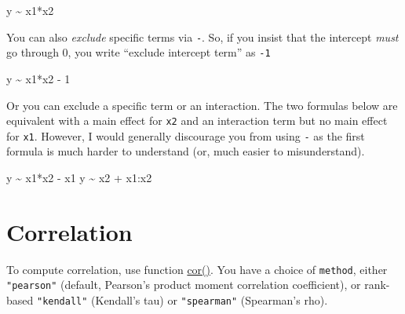 \documentclass[
]{book}
\newenvironment{Shaded}{\begin{snugshade}}{\end{snugshade}}
\newcommand{\AttributeTok}[1]{\textcolor[rgb]{0.77,0.63,0.00}{#1}}
\newcommand{\DecValTok}[1]{\textcolor[rgb]{0.00,0.00,0.81}{#1}}
\newcommand{\FloatTok}[1]{\textcolor[rgb]{0.00,0.00,0.81}{#1}}
\newcommand{\FunctionTok}[1]{\textcolor[rgb]{0.00,0.00,0.00}{#1}}
\newcommand{\NormalTok}[1]{#1}
\newcommand{\OtherTok}[1]{\textcolor[rgb]{0.56,0.35,0.01}{#1}}
\newcommand{\SpecialCharTok}[1]{\textcolor[rgb]{0.00,0.00,0.00}{#1}}
\newcommand{\StringTok}[1]{\textcolor[rgb]{0.31,0.60,0.02}{#1}}
\begin{document}
\begin{Shaded}
\begin{Highlighting}[]
\NormalTok{y }\SpecialCharTok{\textasciitilde{}}\NormalTok{ x1}\SpecialCharTok{*}\NormalTok{x2}
\end{Highlighting}
\end{Shaded}

You can also \emph{exclude} specific terms via \texttt{-}. So, if you insist that the intercept \emph{must} go through 0, you write ``exclude intercept term'' as \texttt{-1}

\begin{Shaded}
\begin{Highlighting}[]
\NormalTok{y }\SpecialCharTok{\textasciitilde{}}\NormalTok{ x1}\SpecialCharTok{*}\NormalTok{x2 }\SpecialCharTok{{-}} \DecValTok{1}
\end{Highlighting}
\end{Shaded}

Or you can exclude a specific term or an interaction. The two formulas below are equivalent with a main effect for \texttt{x2} and an interaction term but no main effect for \texttt{x1}. However, I would generally discourage you from using \texttt{-} as the first formula is much harder to understand (or, much easier to misunderstand).

\begin{Shaded}
\begin{Highlighting}[]
\NormalTok{y }\SpecialCharTok{\textasciitilde{}}\NormalTok{ x1}\SpecialCharTok{*}\NormalTok{x2 }\SpecialCharTok{{-}}\NormalTok{ x1}
\NormalTok{y }\SpecialCharTok{\textasciitilde{}}\NormalTok{ x2 }\SpecialCharTok{+}\NormalTok{ x1}\SpecialCharTok{:}\NormalTok{x2}
\end{Highlighting}
\end{Shaded}

\hypertarget{correlation}{%
\section{Correlation}\label{correlation}}

To compute correlation, use function \href{https://stat.ethz.ch/R-manual/R-devel/library/stats/html/cor.html}{cor()}. You have a choice of \texttt{method}, either \texttt{"pearson"} (default, Pearson's product moment correlation coefficient), or rank-based \texttt{"kendall"} (Kendall's tau) or \texttt{"spearman"} (Spearman's rho).

\begin{Shaded}
\end{Shaded}
\end{document}
